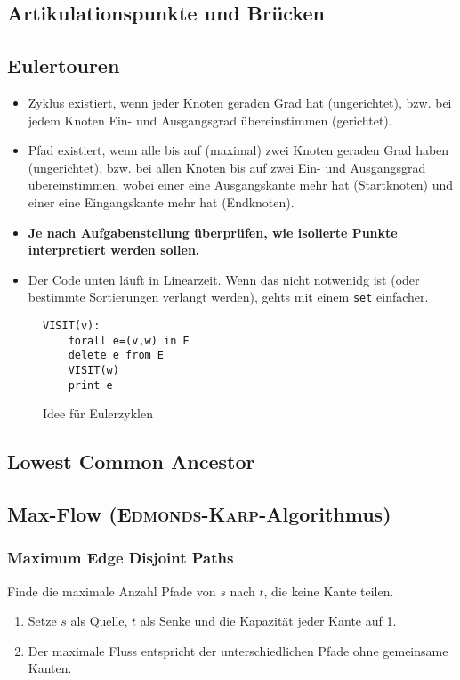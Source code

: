 \subsection{Artikulationspunkte und Brücken}


\subsection{Eulertouren}
\begin{itemize}
	\item Zyklus existiert, wenn jeder Knoten geraden Grad hat (ungerichtet), bzw. bei jedem Knoten Ein- und Ausgangsgrad übereinstimmen (gerichtet).
	\item Pfad existiert, wenn alle bis auf (maximal) zwei Knoten geraden Grad haben (ungerichtet), bzw. bei allen Knoten bis auf zwei Ein- und Ausgangsgrad übereinstimmen, wobei einer eine Ausgangskante mehr hat (Startknoten) und einer eine Eingangskante mehr hat (Endknoten).
	\item \textbf{Je nach Aufgabenstellung überprüfen, wie isolierte Punkte interpretiert werden sollen.}
	\item Der Code unten läuft in Linearzeit. Wenn das nicht notwenidg ist (oder bestimmte Sortierungen verlangt werden), gehts mit einem \lstinline{set} einfacher.
\end{itemize}
\begin{figure}[h]
\begin{lstlisting}
VISIT(v):
	forall e=(v,w) in E
	delete e from E
	VISIT(w)
	print e
\end{lstlisting}
\caption{Idee für Eulerzyklen}
\end{figure}


\subsection{Lowest Common Ancestor}


\subsection{Max-Flow (\textsc{Edmonds-Karp}-Algorithmus)}


\subsubsection{Maximum Edge Disjoint Paths}
Finde die maximale Anzahl Pfade von $s$ nach $t$, die keine Kante teilen.
\begin{enumerate}
	\item Setze $s$ als Quelle, $t$ als Senke und die Kapazität jeder Kante auf 1.
	\item Der maximale Fluss entspricht der unterschiedlichen Pfade ohne gemeinsame Kanten.
\end{enumerate}

